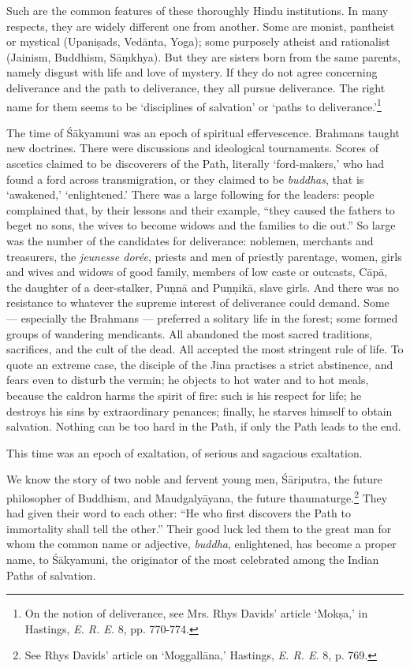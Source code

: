 \documentclass[a4paper, 11pt, oneside, english]{article}
\begin{document}
Such are the common features of these thoroughly Hindu institutions. In many respects, they are widely different one from another. Some are monist, pantheist or mystical (Upaniṣads, Vedānta, Yoga); some purposely atheist and rationalist (Jainism, Buddhism, Sāṃkhya). But they are sisters born from the same parents, namely disgust with life and love of mystery. If they do not agree concerning deliverance and the path to deliverance, they all pursue deliverance. The right name for them seems to be `disciplines of salvation' or `paths to deliverance.'\footnote{On the notion of deliverance, see Mrs. Rhys Davids' article `Mokṣa,' in Hastings, \emph{E. R. E.} 8, pp. 770-774.}

The time of Śākyamuni was an epoch of spiritual effervescence. Brahmans taught new doctrines. There were discussions and ideological tournaments. Scores of ascetics claimed to be discoverers of the Path, literally `ford-makers,' who had found a ford across transmigration, or they claimed to be \emph{buddhas}, that is `awakened,' `enlightened.' There was a large following for the leaders: people complained that, by their lessons and their example, ``they caused the fathers to beget no sons, the wives to become widows and the families to die out.'' So large was the number of the candidates for deliverance: noblemen, merchants and treasurers, the \emph{jeunesse dorée}, priests and men of priestly parentage, women, girls and wives and widows of good family, members of low caste or outcasts, Cāpā, the daughter of a deer-stalker, Puṇnā and Puṇṇikā, slave girls. And there was no resistance to whatever the supreme interest of deliverance could demand. Some --- especially the Brahmans --- preferred a solitary life in the forest; some formed groups of wandering mendicants. All abandoned the most sacred traditions, sacrifices, and the cult of the dead. All accepted the most stringent rule of life. To quote an extreme case, the disciple of the Jina practises a strict abstinence, and fears even to disturb the vermin; he objects to hot water and to hot meals, because the caldron harms the spirit of fire: such is his respect for life; he destroys his sins by extraordinary penances; finally, he starves himself to obtain salvation. Nothing can be too hard in the Path, if only the Path leads to the end.

This time was an epoch of exaltation, of serious and sagacious exaltation.

We know the story of two noble and fervent young men, Śāriputra, the future philosopher of Buddhism, and Maudgalyāyana, the future thaumaturge.\footnote{See Rhys Davids' article on `Moggallāna,' Hastings, \emph{E. R. E.} 8, p. 769.} They had given their word to each other: ``He who first discovers the Path to immortality shall tell the other.'' Their good luck led them to the great man for whom the common name or adjective, \emph{buddha}, enlightened, has become a proper name, to Śākyamuni, the originator of the most celebrated among the Indian Paths of salvation.
\end{document}
